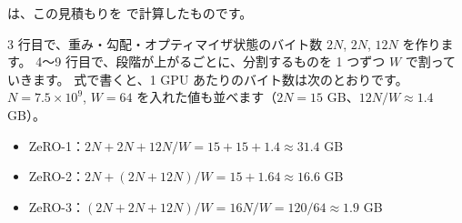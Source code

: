 は、この見積もりを  で計算したものです。


3 行目で、重み・勾配・オプティマイザ状態のバイト数 $2N$, $2N$, $12N$ を作ります。
4〜9 行目で、段階が上がるごとに、分割するものを 1 つずつ $W$ で割っていきます。
式で書くと、1 GPU あたりのバイト数は次のとおりです。
$N=7.5\times10^{9}$, $W=64$ を入れた値も並べます（$2N=15$ GB、$12N/W\approx1.4$ GB）。
\begin{itemize}
\item ZeRO-1：$2N+2N+12N/W=15+15+1.4\approx31.4$ GB
\item ZeRO-2：$2N+(2N+12N)/W=15+1.64\approx16.6$ GB
\item ZeRO-3：$(2N+2N+12N)/W=16N/W=120/64\approx1.9$ GB
\end{itemize}

